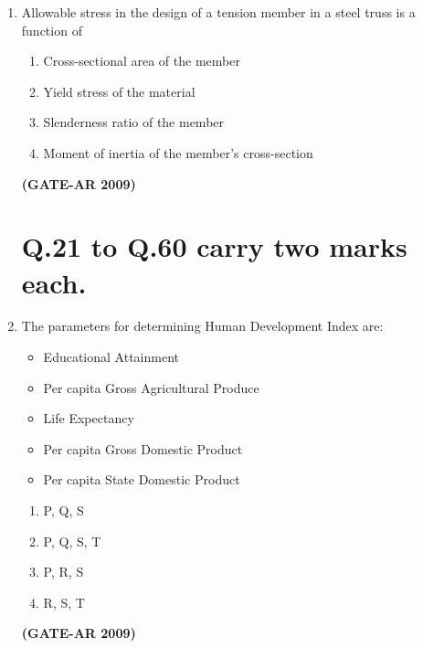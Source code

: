 \documentclass[a4paper,10pt]{article}
\begin{document}
\begin{enumerate}
	\item Allowable stress in the design of a tension member in a steel truss is a function of 
    \begin{enumerate}
        \item Cross-sectional area of the member
        \item Yield stress of the material
        \item Slenderness ratio of the member
        \item Moment of inertia of the member's cross-section
    \end{enumerate}
    \hfill \textbf{(GATE-AR 2009)}

\section*{Q.21 to Q.60 carry two marks each.}

    \item The parameters for determining Human Development Index are: 
    \begin{itemize}
        \item Educational Attainment
        \item Per capita Gross Agricultural Produce
        \item Life Expectancy
        \item Per capita Gross Domestic Product
        \item Per capita State Domestic Product
    \end{itemize}
    \begin{multicols}{4}
	\begin{enumerate}
        \item P, Q, S
        \item P, Q, S, T
        \item P, R, S
        \item R, S, T
    \end{enumerate}
	\end{multicols}
    \hfill \textbf{(GATE-AR 2009)}
    

\end{enumerate}
\end{document}
